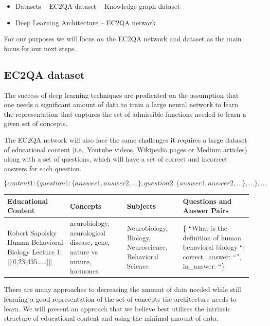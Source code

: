 \documentclass{acm_proc_article-sp}
\providecommand{\tightlist}{%
  \setlength{\itemsep}{0pt}\setlength{\parskip}{0pt}}
\begin{document}
\begin{itemize}
\tightlist
\item
  Datasets -- EC2QA dataset -- Knowledge graph dataset
\item
  Deep Learning Architecture -- EC2QA network
\end{itemize}

For our purposes we will focus on the EC2QA network and dataset as the
main focus for our next steps.

\subsection{EC2QA dataset}\label{ec2qa-dataset}

The success of deep learning techniques are predicated on the assumption
that one needs a significant amount of data to train a large neural
network to learn the representation that captures the set of admissible
functions needed to learn a given set of concepts.

The EC2QA network will also face the same challenges it requires a large
dataset of educational content (i.e.~Youtube videos, Wikipedia pages or
Medium articles) along with a set of questions, which will have a set of
correct and incorrect answers for each question.

\[
 \{content1: \{question1: \{answer1, answer2,...\},  question2: \{answer1, answer2,...\},...\},...
\]

\begin{longtable}[]{@{}llll@{}}
\toprule
Educational Content & Concepts & Subjects & Questions and Answer
Pairs\tabularnewline
\midrule
\endhead
Robert Sapolsky Human Behavioral Biology Lecture 1:
{[}{[}{[}0,23,435\ldots{}\ldots{}{]}{]}{]} & neurobiology, neurological
disease, gene, nature vs nuture, hormones & Neurobiology, Biology,
Neuroscience, Behavioral Science & \{ ``What is the definition of human
behavioral biology ``: correct\_answer: ``'', in\_answer:
``\}\tabularnewline
\bottomrule
\end{longtable}

There are many approaches to decreasing the amount of data needed while
still learning a good representation of the set of concepts the
architecture needs to learn. We will present an approach that we believe
best utilises the intrinsic structure of educational content and using
the minimal amount of data.
\end{document}
